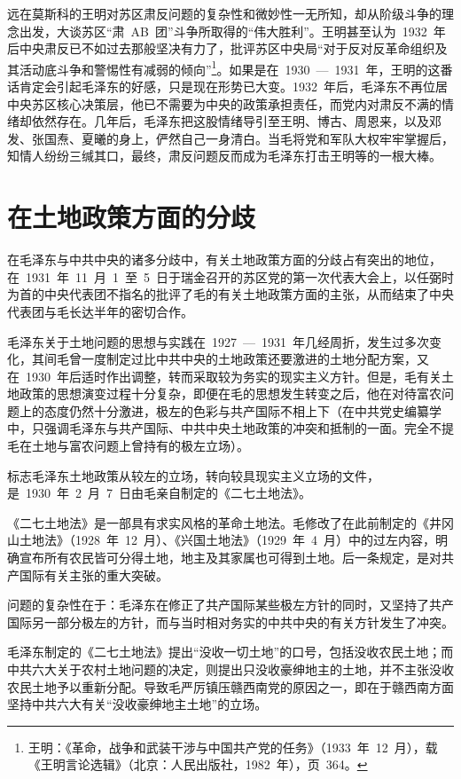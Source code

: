 远在莫斯科的王明对苏区肃反问题的复杂性和微妙性一无所知，却从阶级斗争的理念出发，大谈苏区“肃~AB~团”斗争所取得的“伟大胜利”。王明甚至认为~1932~年后中央肃反已不如过去那般坚决有力了，批评苏区中央局“对于反对反革命组织及其活动底斗争和警惕性有减弱的倾向”\footnote{王明：《革命，战争和武装干涉与中国共产党的任务》（1933~年~12~月），载《王明言论选辑》（北京：人民出版社，1982~年），页~364。}。如果是在~1930~—~1931~年，王明的这番话肯定会引起毛泽东的好感，只是现在形势已大变。1932~年后，毛泽东不再位居中央苏区核心决策层，他已不需要为中央的政策承担责任，而党内对肃反不满的情绪却依然存在。几年后，毛泽东把这股情绪导引至王明、博古、周恩来，以及邓发、张国焘、夏曦的身上，俨然自己一身清白。当毛将党和军队大权牢牢掌握后，知情人纷纷三缄其口，最终，肃反问题反而成为毛泽东打击王明等的一根大棒。

\section{在土地政策方面的分歧}

在毛泽东与中共中央的诸多分歧中，有关土地政策方面的分歧占有突出的地位，在~1931~年~11~月~1~至~5~日于瑞金召开的苏区党的第一次代表大会上，以任弼时为首的中央代表团不指名的批评了毛的有关土地政策方面的主张，从而结束了中央代表团与毛长达半年的密切合作。

毛泽东关于土地问题的思想与实践在~1927~—~1931~年几经周折，发生过多次变化，其间毛曾一度制定过比中共中央的土地政策还要激进的土地分配方案，又在~1930~年后适时作出调整，转而采取较为务实的现实主义方针。但是，毛有关土地政策的思想演变过程十分复杂，即便在毛的思想发生转变之后，他在对待富农问题上的态度仍然十分激进，极左的色彩与共产国际不相上下（在中共党史编纂学中，只强调毛泽东与共产国际、中共中央土地政策的冲突和抵制的一面。完全不提毛在土地与富农问题上曾持有的极左立场）。

标志毛泽东土地政策从较左的立场，转向较具现实主义立场的文件，是~1930~年~2~月~7~日由毛亲自制定的《二七土地法》。

《二七土地法》是一部具有求实风格的革命土地法。毛修改了在此前制定的《井冈山土地法》（1928~年~12~月）、《兴国土地法》（1929~年~4~月）中的过左内容，明确宣布所有农民皆可分得土地，地主及其家属也可得到土地。后一条规定，是对共产国际有关主张的重大突破。

问题的复杂性在于：毛泽东在修正了共产国际某些极左方针的同时，又坚持了共产国际另一部分极左的方针，而与当时相对务实的中共中央的有关方针发生了冲突。

毛泽东制定的《二七土地法》提出“没收一切土地”的口号，包括没收农民土地；而中共六大关于农村土地问题的决定，则提出只没收豪绅地主的土地，并不主张没收农民土地予以重新分配。导致毛严厉镇压赣西南党的原因之一，即在于赣西南方面坚持中共六大有关“没收豪绅地主土地”的立场。

